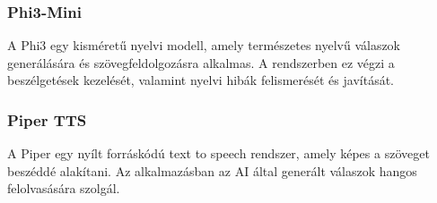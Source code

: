 \subsubsection{Phi3-Mini}
A Phi3 egy kisméretű nyelvi modell, amely természetes nyelvű válaszok generálására és szövegfeldolgozásra alkalmas. A rendszerben ez végzi a beszélgetések kezelését, valamint nyelvi hibák felismerését és javítását. \cite{phi3}

\subsubsection{Piper TTS}
A Piper egy nyílt forráskódú text to speech rendszer, amely képes a szöveget beszéddé alakítani. Az alkalmazásban az AI által generált válaszok hangos felolvasására szolgál. \cite{piper}
